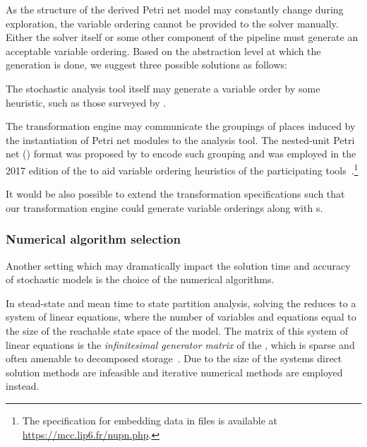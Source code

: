 As the structure of the derived Petri net model may constantly change during exploration, the variable ordering cannot be provided to the solver manually. Either the solver itself or some other component of the  pipeline must generate an acceptable variable ordering. Based on the abstraction level at which the generation is done, we suggest three possible solutions as follows:
\begin{itemize*}
\item The stochastic analysis tool itself may generate a variable order by some heuristic, such as those surveyed by \citet{Amparore17ordering}.
\item The  transformation engine may communicate the groupings of places induced by the instantiation of Petri net modules to the analysis tool. The nested-unit Petri net () format was proposed by \citet{Garavel15nupn} to encode such grouping and was employed in the 2017 edition of the  to aid variable ordering heuristics of the participating tools~\citep{Kordon17mcc}.\footnote{The specification for embedding  data in  files is available at \url{https://mcc.lip6.fr/nupn.php}.}
\item It would be also possible to extend the transformation specifications such that our transformation engine could generate variable orderings along with s.
\end{itemize*}

\subsubsection{Numerical algorithm selection}

Another setting which may dramatically impact the solution time and accuracy of stochastic models is the choice of the numerical algorithms.

In stead-state and mean time to state partition analysis, solving the  reduces to a system of linear equations, where the number of variables and equations equal to the size of the reachable state space of the model. The matrix of this system of linear equations is the \emph{infinitesimal generator matrix} of the , which is sparse and often amenable to decomposed storage~\citep{}. Due to the size of the systems direct solution methods are infeasible and iterative numerical methods are employed instead.

\todo*{}


